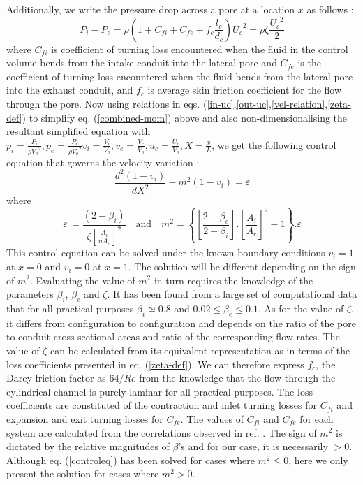 \documentclass[twocolumn,10pt,cleanfoot]{ihmtc}
\begin{document}
%
Additionally, we write the pressure drop across a pore at a location
$x$ as follows : 
%
\begin{equation} \label{zeta-def}
{{P}_{i}}-{{P}_{e}}=\rho(1+{{C}_{fi}}+{{C}_{fe}}+{{f}_{c}}\frac{{{l}_{c}}}{{{d}_{c}}}){{U}_{c}}^{2}=\rho \zeta \frac{{{U}_{c}}^{2}}{2}
\end{equation}where $C_{fi}$ is coefficient of turning loss encountered when the fluid in the control volume bends from the intake conduit
into the lateral pore and $C_{fe}$ is the coefficient of turning loss encountered when the fluid bends from the
lateral pore into the exhaust conduit, and $f_c$ is average skin friction coefficient for the flow through the pore.
%
Now using relations in eqs. (\ref{in-uc},\ref{out-uc},\ref{vel-relation},\ref{zeta-def})
to simplify eq. (\ref{combined-mom}) above and also non-dimensionalising the resultant simplified equation with ${{p}_{i}}=\frac{{{P}_{i}}}{\rho{{V}_{o}}^{2}},{{p}_{e}}=\frac{{{P}_{e}}}{\rho{{V}_{o}}^{2}}{{v}_{i}}=\frac{{{V}_{i}}}{{{V}_{o}}},{{v}_{e}}=\frac{{{V}_{e}}}{{{V}_{o}}},{{u}_{c}}=\frac{{{U}_{c}}}{{{V}_{o}}},X=\frac{x}{L}$,
we get the following control equation that governs the velocity variation : 
%
\begin{equation} \label{controleq}
\frac{{{d}^{2}}(1-{{v}_{i}})}{d{{X}^{2}}}-{{m}^{2}}(1-{{v}_{i}})=\varepsilon
\end{equation}%
%
where 
%
\begin{equation} \label{msq}
\varepsilon\,=\frac{\left( 2-{{\beta }_{i}} \right)}{\zeta{{\left[\frac{{{A}_{i}}}{n{{A}_{c}}} \right]}^{2}}}\,\,\,\,\text{   and    }\,\,\,\,{{m}^{2}}=\left\{ \left[ \frac{2-{{\beta }_{e}}}{2-{{\beta }_{i}}} \right].{{\left[ \frac{{{A}_{i}}}{{{A}_{e}}} \right]}^{2}}-1 \right\}.\varepsilon
\end{equation}
%
%
This control equation can be solved under the known boundary conditions
$v_i=1$ at $x=0$ and $v_i=0$ at $x=1$. The solution will be different
depending on the sign of $m^2$. Evaluating the value of $m^2$ in turn requires the knowledge of the parameters $\beta_i$, $ \beta_e $ and $\zeta$. It has been found from a large set
of computational data that for all practical purposes $\beta_i \simeq 0.8$
and $0.02 \leq \beta_e \leq 0.1$. As for the value of $\zeta$, it differs from configuration to configuration and depends on the ratio of the pore to conduit cross sectional areas and ratio of the corresponding flow rates. The value of $\zeta$ can be calculated from its equivalent representation as in terms of the loss coefficients presented in eq. (\ref{zeta-def}). We can therefore express $f_c$, the Darcy friction factor as $64/Re$ from the knowledge that the flow through the cylindrical channel is purely laminar for all practical purposes. The loss  coefficients are constituted of the contraction and inlet turning losses for $C_{fi}$ and expansion and exit turning losses for $C_{fe}$. The values of $C_{fi}$ and $C_{fe}$ for each system are calculated from the correlations observed in ref. \cite[Chapter~7]{idelchik2005handbook}. The sign of $m^2$ is dictated by the relative magnitudes of $\beta$'s and for our case, it is necessarily $>0$. Although eq. (\ref{controleq}) has been solved for cases where $m^2\leq0$, here we only present the solution for cases where $m^2>0$.\\
\end{document}
